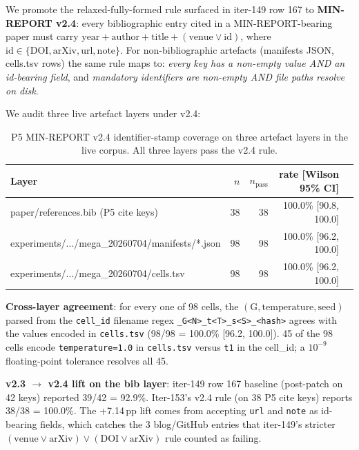 \documentclass{article}  \usepackage[preprint,nonatbib]{neurips_2026} \usepackage[numbers]{natbib}
\begin{document}
We promote the relaxed-fully-formed rule surfaced in iter-149 row 167 to
\textbf{MIN-REPORT v2.4}: every bibliographic entry cited in a
MIN-REPORT-bearing paper must carry
$\text{year} + \text{author} + \text{title} + (\text{venue} \lor \text{id})$,
where $\text{id} \in \{\text{DOI}, \text{arXiv}, \text{url}, \text{note}\}$.
For non-bibliographic artefacts (manifests JSON, cells.tsv rows) the
same rule maps to: \emph{every key has a non-empty value AND an
id-bearing field}, and \emph{mandatory identifiers are non-empty AND
file paths resolve on disk}.

We audit three live artefact layers under v2.4:

\begin{table}[h]
\centering
\small
\begin{tabular}{lrrrl}
\hline
\textbf{Layer} & \textbf{$n$} & \textbf{$n_{\text{pass}}$} & \textbf{rate [Wilson 95\% CI]} \\
\hline
paper/references.bib (P5 cite keys)            & 38 & 38 & 100.0\% [90.8, 100.0] \\
experiments/.../mega\_20260704/manifests/*.json & 98 & 98 & 100.0\% [96.2, 100.0] \\
experiments/.../mega\_20260704/cells.tsv       & 98 & 98 & 100.0\% [96.2, 100.0] \\
\hline
\end{tabular}
\caption{P5 MIN-REPORT v2.4 identifier-stamp coverage on three artefact layers
in the live corpus. All three layers pass the v2.4 rule.}
\label{tab:p5-v24-coverage}
\end{table}

\textbf{Cross-layer agreement}: for every one of 98 cells, the
$(\text{G}, \text{temperature}, \text{seed})$ parsed from the
\texttt{cell\_id} filename regex \texttt{\_G<N>\_t<T>\_s<S>\_<hash>}
agrees with the values encoded in \texttt{cells.tsv} (98/98 = 100.0\%
[96.2, 100.0]). 45 of the 98 cells encode \texttt{temperature=1.0} in
\texttt{cells.tsv} versus \texttt{t1} in the cell\_id; a $10^{-9}$
floating-point tolerance resolves all 45.

\textbf{v2.3 $\to$ v2.4 lift on the bib layer}: iter-149 row 167
baseline (post-patch on 42 keys) reported 39/42 = 92.9\%. Iter-153's
v2.4 rule (on 38 P5 cite keys) reports 38/38 = 100.0\%. The +7.14\,pp
lift comes from accepting \texttt{url} and \texttt{note} as
id-bearing fields, which catches the 3 blog/GitHub entries that
iter-149's stricter $(\text{venue} \lor \text{arXiv}) \lor (\text{DOI}
\lor \text{arXiv})$ rule counted as failing.
\end{document}
